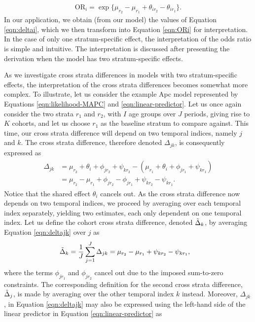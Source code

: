 \begin{align}
    \text{OR}_i = \exp\{\mu_{r_2} - \mu_{r_1 } + \theta_{ir_2} - \theta_{ir_1}\}.
    \label{eqn:ORi}
\end{align}
In our application, we obtain (from our model) the values of Equation \eqref{eqn:deltai}, which we then transform into Equation \eqref{eqn:ORi} for interpretation. In the case of only one stratum-specific effect, the interpretation of the odds ratio is simple and intuitive. The interpretation is discussed after presenting the derivation when the model has two stratum-specific effects.

\vspace{-0.2cm}
As we investigate cross strata differences in models with two stratum-specific effects, the interpretation of the cross strata differences becomes somewhat more complex. To illustrate, let us consider the example Apc model represented by Equations \eqref{eqn:likelihood-MAPC} and \eqref{eqn:linear-predictor}. Let us once again consider the two strata $r_1$ and $r_2$, with $I$ age groups over $J$ periods, giving rise to $K$ cohorts, and let us choose $r_1$ as the baseline stratum to compare against. This time, our cross strata difference will depend on two temporal indices, namely $j$ and $k$. The cross strata difference, therefore denoted $\Delta_{jk}$, is consequently expressed as
\begin{align}
    \begin{split}
    \Delta_{jk} &= \mu_{r_2} + \theta_i + \phi_{jr_2} + \psi_{kr_2} - (\mu_{r_1} + \theta_i + \phi_{jr_1} + \psi_{kr_1})\\
    & = \mu_{r_2} - \mu_{r_1 } + \phi_{jr_2} - \phi_{jr_1} + \psi_{kr_2} - \psi_{kr_1}.
    \end{split}
    \label{eqn:deltajk}
\end{align}
Notice that the shared effect $\theta_i$ cancels out. As the cross strata difference now depends on two temporal indices, we proceed by averaging over each temporal index separately, yielding two estimates, each only dependent on one temporal index. Let us define the cohort cross strata difference, denoted $\Tilde{\Delta}_k$, by averaging Equation \eqref{eqn:deltajk} over $j$ as
\begin{align}
    \Tilde{\Delta}_{k} & = \frac{1}{J}\sum_{j=1}^J \Delta_{jk} = \mu_{r_2} - \mu_{r_1 } + \psi_{kr_2} - \psi_{kr_1},
    \label{eqn:deltak}
\end{align}
where the terms $\phi_{jr_1}$ and $\phi_{jr_2}$ cancel out due to the imposed sum-to-zero constraints. The corresponding definition for the second cross strata difference, $\Tilde{\Delta}_j$, is made by averaging over the other temporal index $k$ instead. Moreover, $\Delta_{jk}$, in Equation \eqref{eqn:deltajk} may also be expressed using the left-hand side of the linear predictor in Equation \eqref{eqn:linear-predictor} as
